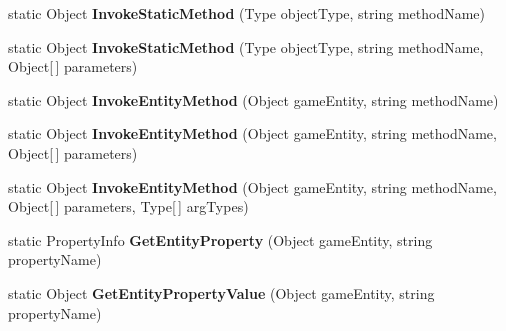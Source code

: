 \begin{DoxyCompactItemize}
\item 
\hypertarget{class_s_e_mod_a_p_i_internal_1_1_a_p_i_1_1_entity_1_1_base_object_a2c1dc1d3e364c06f37adc8f07b70d7c2}{}static Object {\bfseries Invoke\+Static\+Method} (Type object\+Type, string method\+Name)\label{class_s_e_mod_a_p_i_internal_1_1_a_p_i_1_1_entity_1_1_base_object_a2c1dc1d3e364c06f37adc8f07b70d7c2}

\item 
\hypertarget{class_s_e_mod_a_p_i_internal_1_1_a_p_i_1_1_entity_1_1_base_object_a285c049e87188d0ee6845be8df7d6a4a}{}static Object {\bfseries Invoke\+Static\+Method} (Type object\+Type, string method\+Name, Object\mbox{[}$\,$\mbox{]} parameters)\label{class_s_e_mod_a_p_i_internal_1_1_a_p_i_1_1_entity_1_1_base_object_a285c049e87188d0ee6845be8df7d6a4a}

\item 
\hypertarget{class_s_e_mod_a_p_i_internal_1_1_a_p_i_1_1_entity_1_1_base_object_a2a2cf78443d1b01fe01c3e206bb444c7}{}static Object {\bfseries Invoke\+Entity\+Method} (Object game\+Entity, string method\+Name)\label{class_s_e_mod_a_p_i_internal_1_1_a_p_i_1_1_entity_1_1_base_object_a2a2cf78443d1b01fe01c3e206bb444c7}

\item 
\hypertarget{class_s_e_mod_a_p_i_internal_1_1_a_p_i_1_1_entity_1_1_base_object_a625c84925850f395e005441766f3aa61}{}static Object {\bfseries Invoke\+Entity\+Method} (Object game\+Entity, string method\+Name, Object\mbox{[}$\,$\mbox{]} parameters)\label{class_s_e_mod_a_p_i_internal_1_1_a_p_i_1_1_entity_1_1_base_object_a625c84925850f395e005441766f3aa61}

\item 
\hypertarget{class_s_e_mod_a_p_i_internal_1_1_a_p_i_1_1_entity_1_1_base_object_add090f5fb687a4dc69b19a19f59c3a0c}{}static Object {\bfseries Invoke\+Entity\+Method} (Object game\+Entity, string method\+Name, Object\mbox{[}$\,$\mbox{]} parameters, Type\mbox{[}$\,$\mbox{]} arg\+Types)\label{class_s_e_mod_a_p_i_internal_1_1_a_p_i_1_1_entity_1_1_base_object_add090f5fb687a4dc69b19a19f59c3a0c}

\item 
\hypertarget{class_s_e_mod_a_p_i_internal_1_1_a_p_i_1_1_entity_1_1_base_object_a0eee1c541982d45eee882901df036a5e}{}static Property\+Info {\bfseries Get\+Entity\+Property} (Object game\+Entity, string property\+Name)\label{class_s_e_mod_a_p_i_internal_1_1_a_p_i_1_1_entity_1_1_base_object_a0eee1c541982d45eee882901df036a5e}

\item 
\hypertarget{class_s_e_mod_a_p_i_internal_1_1_a_p_i_1_1_entity_1_1_base_object_a65adefe691d5890f76bdfa879dcded47}{}static Object {\bfseries Get\+Entity\+Property\+Value} (Object game\+Entity, string property\+Name)\label{class_s_e_mod_a_p_i_internal_1_1_a_p_i_1_1_entity_1_1_base_object_a65adefe691d5890f76bdfa879dcded47}


\end{DoxyCompactItemize}
